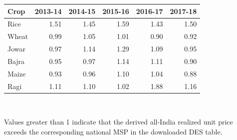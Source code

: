 \begin{small}
\begin{tabular}{lrrrrr}
\toprule
Crop & 2013-14 & 2014-15 & 2015-16 & 2016-17 & 2017-18 \\
\midrule
Rice & 1.51 & 1.45 & 1.59 & 1.43 & 1.50 \\
Wheat & 0.99 & 1.05 & 1.01 & 0.90 & 0.92 \\
Jowar & 0.97 & 1.14 & 1.29 & 1.09 & 0.95 \\
Bajra & 0.95 & 0.97 & 1.14 & 1.11 & 0.90 \\
Maize & 0.93 & 0.96 & 1.10 & 1.04 & 0.88 \\
Ragi & 1.11 & 1.10 & 1.02 & 1.88 & 1.16 \\
\bottomrule
\end{tabular}
\\[0.3em]
\parbox{0.95\linewidth}{\footnotesize Values greater than 1 indicate that the derived all-India realized unit price exceeds the corresponding national MSP in the downloaded DES table.}
\end{small}
